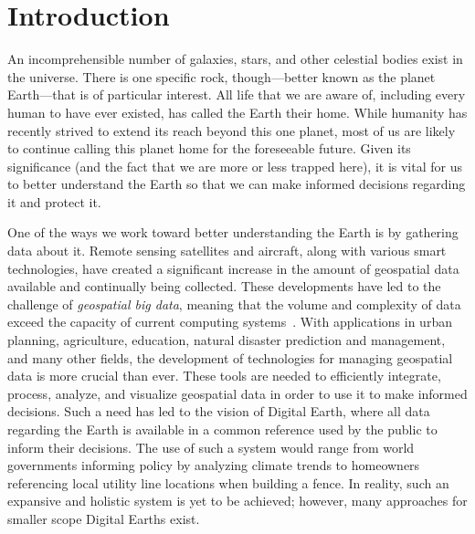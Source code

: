 \chapter{Introduction} \label{chap:introduction}
An incomprehensible number of galaxies, stars, and other celestial bodies exist in the universe.
There is one specific rock, though---better known as the planet Earth---that is of particular interest.
All life that we are aware of, including every human to have ever existed, has called the Earth their home.
While humanity has recently strived to extend its reach beyond this one planet, most of us are likely to continue calling this planet home for the foreseeable future.
Given its significance (and the fact that we are more or less trapped here), it is vital for us to better understand the Earth so that we can make informed decisions regarding it and protect it.


One of the ways we work toward better understanding the Earth is by gathering data about it.
Remote sensing satellites and aircraft, along with various smart technologies, have created a significant increase in the amount of geospatial data available and continually being collected.
These developments have led to the challenge of \textit{geospatial big data}, meaning that the volume and complexity of data exceed the capacity of current computing systems~\cite{lee2015geospatial}.
With applications in urban planning, agriculture, education, natural disaster prediction and management, and many other fields, the development of technologies for managing geospatial data is more crucial than ever.
These tools are needed to efficiently integrate, process, analyze, and visualize geospatial data in order to use it to make informed decisions.
Such a need has led to the vision of Digital Earth, where all data regarding the Earth is available in a common reference used by the public to inform their decisions.
The use of such a system would range from world governments informing policy by analyzing climate trends to homeowners referencing local utility line locations when building a fence.
In reality, such an expansive and holistic system is yet to be achieved; however, many approaches for smaller scope Digital Earths exist.


